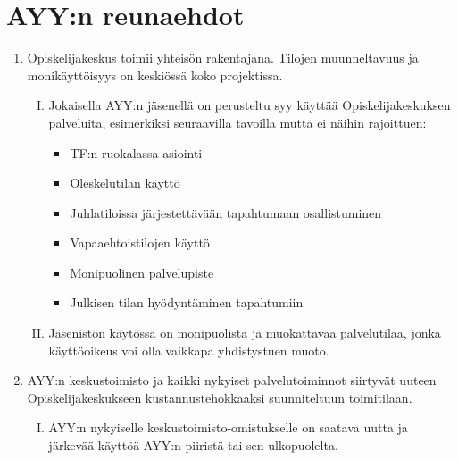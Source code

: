\documentclass[a4paper, 12pt, finnish]{report}
\begin{document}
\section*{AYY:n reunaehdot}
\begin{enumerate}
    \item{Opiskelijakeskus toimii yhteisön rakentajana. Tilojen muunneltavuus ja monikäyttöisyys on keskiössä koko projektissa.}
        \begin{enumerate}[I.]
            \item{Jokaisella AYY:n jäsenellä on perusteltu syy käyttää Opiskelijakeskuksen palveluita, esimerkiksi seuraavilla tavoilla mutta ei näihin rajoittuen:}
                \begin{itemize}
                    \item{TF:n ruokalassa asiointi}
                    \item{Oleskelutilan käyttö}
                    \item{Juhlatiloissa järjestettävään tapahtumaan osallistuminen}
                    \item{Vapaaehtoistilojen käyttö}
                    \item{Monipuolinen palvelupiste}
                    \item{Julkisen tilan hyödyntäminen tapahtumiin}
                \end{itemize}

            \item{Jäsenistön käytössä on monipuolista ja muokattavaa palvelutilaa, jonka käyttöoikeus voi olla vaikkapa yhdistystuen muoto.}
        \end{enumerate}

    \item{AYY:n keskustoimisto ja kaikki nykyiset palvelutoiminnot siirtyvät uuteen Opiskelijakeskukseen kustannustehokkaaksi suunniteltuun toimitilaan.}
        \begin{enumerate}[I.]
            \item{AYY:n nykyiselle keskustoimisto-omistukselle on saatava uutta ja järkevää käyttöä AYY:n piiristä tai sen ulkopuolelta.}
        \end{enumerate}


\end{enumerate}
\end{document}
